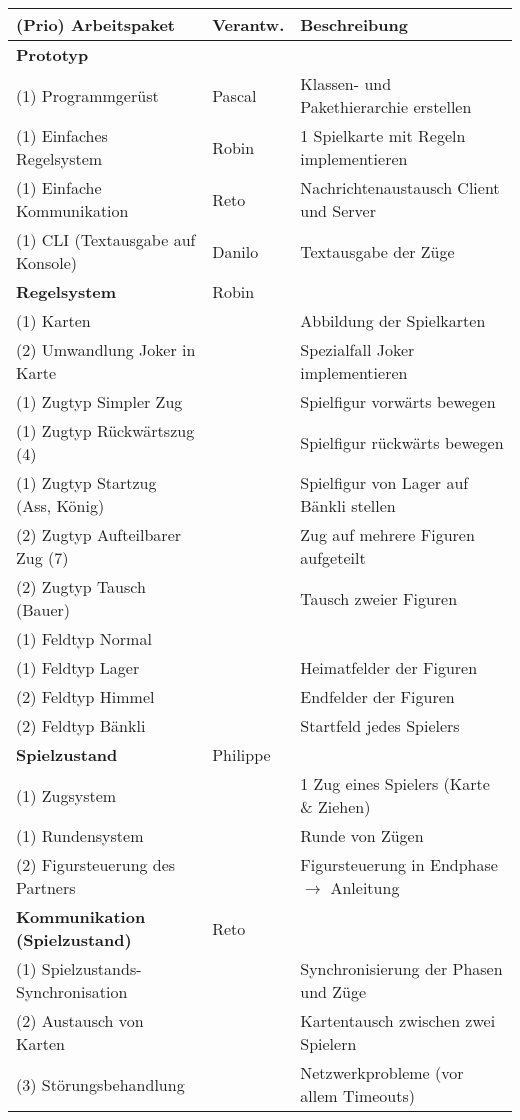 \documentclass[a4paper,12pt,halfparskip,DIV14]{scrartcl}
\begin{document}
\begin{tabular}{@{} l l l @{}}
\toprule
(Prio) Arbeitspaket & Verantw. & Beschreibung \\
\midrule
\textbf{Prototyp} &  & \\
(1) Programmgerüst & Pascal & Klassen- und Pakethierarchie erstellen \\
(1) Einfaches Regelsystem & Robin & 1 Spielkarte mit Regeln implementieren \\
(1) Einfache Kommunikation & Reto & Nachrichtenaustausch Client und Server \\
(1) CLI (Textausgabe auf Konsole) & Danilo & Textausgabe der Züge \\
\midrule
\textbf{Regelsystem} & Robin & \\
(1) Karten &  & Abbildung der Spielkarten \\
(2) Umwandlung Joker in Karte &  & Spezialfall Joker implementieren \\
(1) Zugtyp Simpler Zug &  & Spielfigur vorwärts bewegen \\
(1) Zugtyp Rückwärtszug (4) &  & Spielfigur rückwärts bewegen \\
(1) Zugtyp Startzug (Ass, König) &  & Spielfigur von Lager auf Bänkli stellen \\
(2) Zugtyp Aufteilbarer Zug (7) &  & Zug auf mehrere Figuren aufgeteilt \\
(2) Zugtyp Tausch (Bauer) &  & Tausch zweier Figuren \\
(1) Feldtyp Normal &  & \\
(1) Feldtyp Lager &  & Heimatfelder der Figuren \\
(2) Feldtyp Himmel &  & Endfelder der Figuren \\
(2) Feldtyp Bänkli &  & Startfeld jedes Spielers \\
\midrule
\textbf{Spielzustand} & Philippe & \\
(1) Zugsystem &  & 1 Zug eines Spielers (Karte \& Ziehen) \\
(1) Rundensystem &  & Runde von Zügen \\
(2) Figursteuerung des Partners &  & Figursteuerung in Endphase $\rightarrow$ Anleitung \\
\midrule
\textbf{Kommunikation (Spielzustand)} & Reto & \\
(1) Spielzustands-Synchronisation &  & Synchronisierung der Phasen und Züge \\
(2) Austausch von Karten &  & Kartentausch zwischen zwei Spielern \\
(3) Störungsbehandlung &  & Netzwerkprobleme (vor allem Timeouts) \\

\end{tabular}
\end{document}
